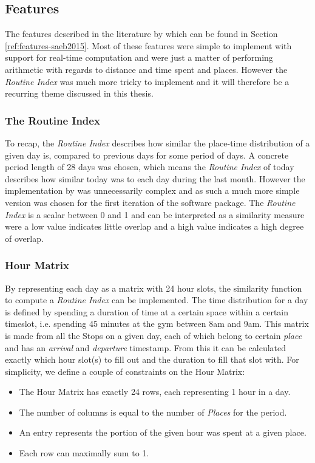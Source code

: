 \subsection{Features}
The features described in the literature by \cite{Saeb2015} which can be found in Section \ref{ref:features-saeb2015}. Most of these features were simple to implement with support for real-time computation and were just a matter of performing arithmetic with regards to distance and time spent and places. However the \textit{Routine Index} \cite{Saeb2015, Canzian2015} was much more tricky to implement and it will therefore be a recurring theme discussed in this thesis.

\subsubsection*{The Routine Index}
To recap, the \textit{Routine Index} describes how similar the place-time distribution of a given day is, compared to previous days for some period of days. A concrete period length of 28 days was chosen, which means the \textit{Routine Index} of today describes how similar today was to each day during the last month. However the implementation by \cite{Canzian2015} was unnecessarily complex and as such a much more simple version was chosen for the first iteration of the software package. The \textit{Routine Index} is a scalar between 0 and 1 and can be interpreted as a similarity measure were a low value indicates little overlap and a high value indicates a high degree of overlap. 

\subsubsection*{Hour Matrix}
By representing each day as a matrix with 24 hour slots, the similarity function to compute a \textit{Routine Index} can be implemented. The time distribution for a day is defined by spending a duration of time at a certain space within a certain timeslot, i.e. spending 45 minutes at the gym between 8am and 9am. This matrix is made from all the Stops on a given day, each of which belong to certain \textit{place} and has an \textit{arrival} and \textit{
departure} timestamp. From this it can be calculated exactly which hour slot(s) to fill out and the duration to fill that slot with. For simplicity, we define a couple of constraints on the Hour Matrix:

\begin{itemize}
    \item The Hour Matrix has exactly 24 rows, each representing 1 hour in a day.
    \item The number of columns is equal to the number of \textit{Places} for the period. 
    \item An entry represents the portion of the given hour was spent at a given place.
    \item Each row can maximally sum to 1.
\end{itemize}

